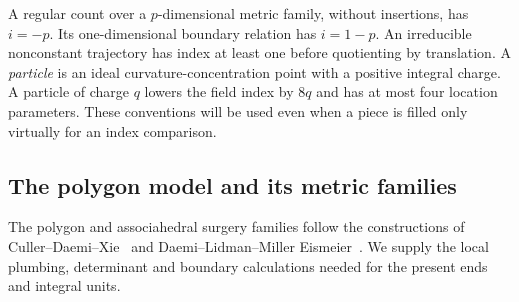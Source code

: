 A regular count over a $p$-dimensional metric family, without
insertions, has $i=-p$.  Its one-dimensional boundary relation has
$i=1-p$.  An irreducible nonconstant trajectory has index at least one
before quotienting by translation.  A \emph{particle} is an ideal
curvature-concentration point with a positive integral charge.  A particle
of charge $q$ lowers
the field index by $8q$ and has at most four location parameters.
These conventions will be used even when a piece is filled only
virtually for an index comparison.

\subsection{The polygon model and its metric families}

The polygon and associahedral surgery families follow the constructions
of Culler--Daemi--Xie~\cite[Section~4.3 and Theorem~4.56,
arXiv version~1]{CullerDaemiXie2020} and
Daemi--Lidman--Miller Eismeier~\cite[Section~5]{DaemiLidmanMillerEismeier2025}.
We supply the local plumbing, determinant and boundary calculations
needed for the present ends and integral units.

